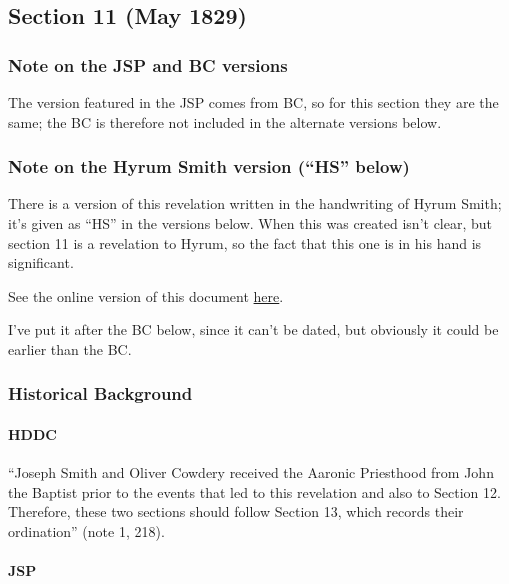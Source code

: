 \subsection{Section 11 (May 1829)}
	\label{DC11}
	
	\subsubsection{Note on the JSP and BC versions}
	
		The version featured in the JSP comes from BC, so for this section they are the same; the BC is therefore not included in the alternate versions below.
		
	\subsubsection{Note on the Hyrum Smith version (``HS'' below)}
	
		There is a version of this revelation written in the handwriting of Hyrum Smith; it's given as ``HS'' in the versions below. When this was created isn't clear, but section 11 is a revelation to Hyrum, so the fact that this one is in his hand is significant. 
		
		See the online version of this document \href{https://www.josephsmithpapers.org/paper-summary/revelation-may-1829-a-dc-11-in-handwriting-of-hyrum-smith/1}{here}.
		
		I've put it after the BC below, since it can't be dated, but obviously it could be earlier than the BC.
	
	\subsubsection{Historical Background}
		\label{DC11-HB}
		
		\paragraph{HDDC}
		
			``Joseph Smith and Oliver Cowdery received the Aaronic Priesthood from John the Baptist prior to the events that led to this revelation and also to Section 12. Therefore, these two sections should follow Section 13, which records their ordination'' (note 1, 218).
		
		\paragraph{JSP}
			
